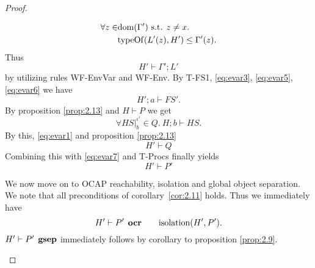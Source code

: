\begin{proof}
\begin{description}
\begin{description}
\begin{description}
\begin{equation*}
\begin{aligned}
                  \forall z \in &\mbox{$\mathrm{dom}$}(\Gamma') \text{ s.t. } z \neq x. \\
                  & \mbox{$\mathrm{typeOf}$}(L'(z), H') \leq \Gamma'(z).
                \end{aligned}
              \end{equation*}
              Thus
              \begin{equation} \label{eq:evar6}
                H' \vdash \Gamma'; L'
              \end{equation}
              by utilizing rules {\sc WF-EnvVar} and {\sc WF-Env}.
              By {\sc T-FS1}, \eqref{eq:evar3}, \eqref{eq:evar5},
              \eqref{eq:evar6} we have
              \begin{equation} \label{eq:evar7}
                H'; a \vdash FS'.
              \end{equation}
              By proposition \ref{prop:2.13} and $H \vdash P$ we get
              \begin{equation*} 
                \forall HS|_b^{\iota'} \in Q. \: H; b \vdash HS.
              \end{equation*}
              By this, \eqref{eq:evar1} and proposition \ref{prop:2.13}
              \begin{equation*}
                H' \vdash Q
              \end{equation*}
              Combining this with \eqref{eq:evar7} and {\sc T-Procs} finally
              yields
              \begin{equation*}
                H' \vdash P'
              \end{equation*}

              We now move on to OCAP reachability, isolation and global object
              separation. We note that all preconditions of
              corollary~\ref{cor:2.11} holds. Thus we immediately have 
              \begin{equation*}
                H' \vdash P' \:\: \mbox{\bf ocr} \quad\quad \mbox{$\mathrm{isolation}$}(H', P').
              \end{equation*}
              $H' \vdash P' \:\: \mbox{\bf gsep}$ immediately follows by corollary to
              proposition \ref{prop:2.9}.


\end{description}
\end{description}
\end{description}
\end{proof}
